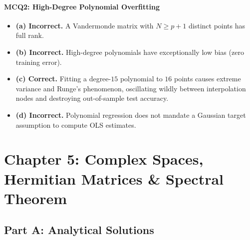 \paragraph{MCQ2: High-Degree Polynomial Overfitting}
\begin{itemize}
    \item \textbf{(a) Incorrect.} A Vandermonde matrix with $N \ge p+1$ distinct points has full rank.
    \item \textbf{(b) Incorrect.} High-degree polynomials have exceptionally low bias (zero training error).
    \item \textbf{(c) Correct.} Fitting a degree-$15$ polynomial to $16$ points causes extreme variance and Runge's phenomenon, oscillating wildly between interpolation nodes and destroying out-of-sample test accuracy.
    \item \textbf{(d) Incorrect.} Polynomial regression does not mandate a Gaussian target assumption to compute OLS estimates.
\end{itemize}

\section*{Chapter 5: Complex Spaces, Hermitian Matrices \& Spectral Theorem}

\subsection*{Part A: Analytical Solutions}

